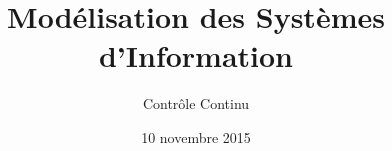 \title{
   Modélisation des Systèmes d'Information
}
\author{
	Contrôle Continu
}
\date{10 novembre 2015}
